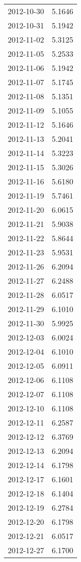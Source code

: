\begin{tabular}{lr}
2012-10-30 &      5.1646 \\
2012-10-31 &      5.1942 \\
2012-11-02 &      5.3125 \\
2012-11-05 &      5.2533 \\
2012-11-06 &      5.1942 \\
2012-11-07 &      5.1745 \\
2012-11-08 &      5.1351 \\
2012-11-09 &      5.1055 \\
2012-11-12 &      5.1646 \\
2012-11-13 &      5.2041 \\
2012-11-14 &      5.3223 \\
2012-11-15 &      5.3026 \\
2012-11-16 &      5.6180 \\
2012-11-19 &      5.7461 \\
2012-11-20 &      6.0615 \\
2012-11-21 &      5.9038 \\
2012-11-22 &      5.8644 \\
2012-11-23 &      5.9531 \\
2012-11-26 &      6.2094 \\
2012-11-27 &      6.2488 \\
2012-11-28 &      6.0517 \\
2012-11-29 &      6.1010 \\
2012-11-30 &      5.9925 \\
2012-12-03 &      6.0024 \\
2012-12-04 &      6.1010 \\
2012-12-05 &      6.0911 \\
2012-12-06 &      6.1108 \\
2012-12-07 &      6.1108 \\
2012-12-10 &      6.1108 \\
2012-12-11 &      6.2587 \\
2012-12-12 &      6.3769 \\
2012-12-13 &      6.2094 \\
2012-12-14 &      6.1798 \\
2012-12-17 &      6.1601 \\
2012-12-18 &      6.1404 \\
2012-12-19 &      6.2784 \\
2012-12-20 &      6.1798 \\
2012-12-21 &      6.0517 \\
2012-12-27 &      6.1700 \\

\end{tabular}
